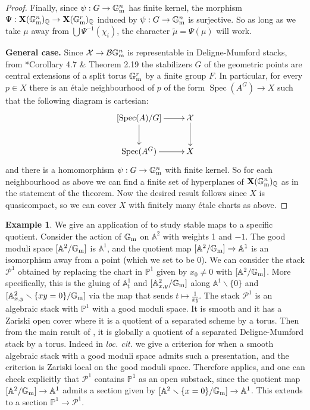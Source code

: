\documentclass{amsart}
\newcommand{\bA}{\mathbb{A}}
\newcommand{\bG}{\mathbb{G}}
\newcommand{\bP}{\mathbb{P}}
\newcommand{\sP}{\mathscr{P}}
\newcommand{\cB}{\mathcal{B}}
\newcommand{\cX}{\mathcal{X}}
\newcommand{\spec}{\operatorname{Spec}}
\newcommand{\Gm}{\bG_{{\rm m}}}
\theoremstyle{definition}
\theoremstyle{definition}
\newtheorem{example}[theorem]{Example}
\begin{document}
{\begin{proof}
    Finally, since $\psi:G\to\Gm^n$ has finite kernel, the morphism
    $\Psi:\mathbf{X}(\Gm^n)_{\mathbb{Q}}\to \mathbf{X}(\Gm^r)_{\mathbb{Q}}$ induced by $\psi:G\to \Gm^n$ is surjective.
    So as long as we take $\mu$ away from $\bigcup\Psi^{-1}(\chi_i)$,
    the character $\widetilde{\mu}=\Psi(\mu)$ will work. 

    \textbf{General case.} Since $\cX\to \cB\Gm^n$ is representable in Deligne-Mumford stacks, from \cite{di2024effective}*{Corollary 4.7 \& Theorem 2.19} the stabilizers $G$ of the geometric points are central extensions of a split torus $\Gm^r$ by a finite group $F$.
    In particular, for every $p\in X$ there is an \'etale neighbourhood of $p$ of the form $\spec(A^G)\to X$ such that the following diagram is cartesian:
    \[
    \xymatrix{[\spec(A)/G]\ar[r] \ar[d] & \cX\ar[d] \\ \spec(A^G)\ar[r] & X}
    \]
    and there is a homomorphism $\psi:G\to \Gm^n$ with finite kernel. So for each neighbourhood as above we can find a finite set of hyperplanes of $\mathbf{X}(\Gm^n)_{\mathbb{Q}}$ as in the statement of the theorem.
    Now the desired result follows since $X$ is quasicompact, so we can cover $X$ with finitely many \'etale charts as above. 
\end{proof}
\begin{example}
We give an application of  to study stable maps to a specific quotient. Consider the action of $\Gm$ on $\bA^2$ with weights 1 and $-1$. The good moduli space $[\bA^2/\Gm]$ is $\bA^1$, and the quotient map $[\bA^2/\Gm]\to \bA^1$ is an isomorphism away from a point (which we set to be 0). We can consider the stack $\sP^1$ obtained by replacing the chart in $\bP^1$ given by $x_0\neq 0$ with $[\bA^2/\Gm]$.
More specifically, this is the gluing of $\bA^1_t$ and $[\bA^2_{x,y}/\Gm]$ along $\bA^1\smallsetminus\{0\}$ and $[\bA^2_{x,y}\smallsetminus\{xy=0\}/\Gm]$ via the map that sends $t\mapsto \frac{1}{xy}$. The stack $\sP^1$ is an algebraic stack with $\bP^1$ with a good moduli space. It is smooth and it has a Zariski open cover where it is a quotient of a separated scheme by a torus.
Then from the main result of \cite{di2024effective}, it is globally a quotient of a separated Deligne-Mumford stack by a torus. Indeed in \textit{loc. cit.} we give a criterion for when a smooth algebraic stack with a good moduli space admits such a presentation, and the criterion is Zariski local on the good moduli space. Therefore  applies, and one can check explicitly that $\sP^1$ contains $\bP^1$ as an open substack, since the quotient map $[\bA^2/\Gm]\to \bA^1$ admits a section given by $[\bA^2\smallsetminus\{x=0\}/\Gm]\to \bA^1$. This extends to a section $\bP^1\to \sP^1$. 


\end{example}}
\end{document}

